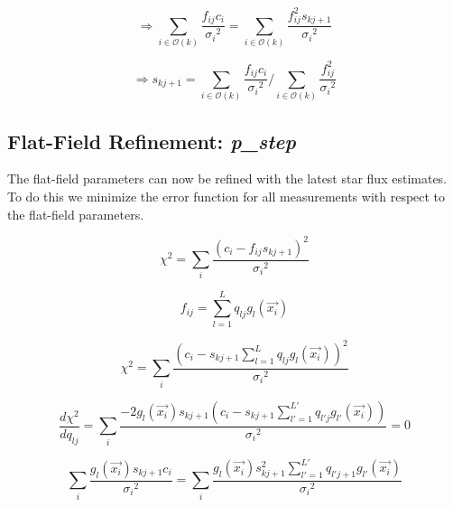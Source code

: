 \documentclass[12pt,a4paper,twoside]{article}
\begin{document}
\begin{equation}
\Rightarrow \sum_{i \in \mathcal{O}(k)} \frac{f_{ij} c_i}{{\sigma_i}^2}= \sum_{i \in \mathcal{O}(k)} \frac{f_{ij}^2 s_{kj+1}}{{\sigma_i}^2}
\end{equation}

\begin{equation}
\Rightarrow s_{kj+1} = {\sum_{i \in \mathcal{O}(k)} \frac{f_{ij} c_i}{{\sigma_i}^2}}/{\sum_{i \in \mathcal{O}(k)} \frac{f_{ij}^2}{{\sigma_i}^2}}
\end{equation}

\subsection{Flat-Field Refinement: \textbf{\textit{p\_step}}}
The flat-field parameters can now be refined with the latest star flux estimates. To do this we minimize the error function for all measurements with respect to the flat-field parameters.

\begin{equation}
\chi^2 = \sum_{i} \frac{(c_i-f_{ij}s_{kj+1})^2}{{\sigma_i}^2}
\end{equation}

\begin{equation}
f_{ij} = \sum_{l = 1}^L q_{lj} g_l(\vec{x_i})
\end{equation}

\begin{equation}
\chi^2 = \sum_{i} \frac{(c_i- s_{kj+1} \sum_{l = 1}^L q_{lj} g_l(\vec{x_i}))^2}{{\sigma_i}^2}
\end{equation}

\begin{equation}
\frac{d\chi^2}{dq_{lj}} = \sum_{i} \frac{-2 g_l(\vec{x_i}) s_{kj+1} (c_i- s_{kj+1} \sum_{l' = 1}^{L'} q_{l'j} g_{l'}(\vec{x_i}))}{{\sigma_i}^2} = 0
\end{equation}

\begin{equation}
\sum_{i} \frac{g_l(\vec{x_i}) s_{kj+1} c_i}{{\sigma_i}^2} = \sum_{i} \frac{g_l(\vec{x_i}) s_{kj+1}^2 \sum_{l' = 1}^{L'} q_{l'j+1} g_{l'}(\vec{x_i})}{{\sigma_i}^2}
\end{equation}
\end{document}
